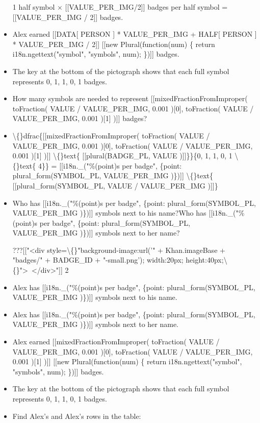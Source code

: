 \documentclass{article}
\begin{document}
\begin{itemize}
                            1 half symbol  $\times$ [[VALUE\_PER\_IMG/2]] badges per half symbol  = [[VALUE\_PER\_IMG / 2]]
                            badges.
  \item Alex earned [[DATA[ PERSON ] * VALUE\_PER\_IMG + HALF[ PERSON ] * VALUE\_PER\_IMG / 2]] [[new Plural(function(num) \{
            return i18n.ngettext("symbol", "symbols", num);
        \})]] badges.
  \item The key at the bottom of the pictograph shows that each full symbol represents 0, 1, 1, 0, 1 badges.
  \item How many symbols are needed to represent [[mixedFractionFromImproper( toFraction( VALUE / VALUE\_PER\_IMG, 0.001 )[0], toFraction( VALUE / VALUE\_PER\_IMG, 0.001 )[1] )]] badges?
  \item \textbackslash\{\}dfrac\{[[mixedFractionFromImproper( toFraction( VALUE / VALUE\_PER\_IMG, 0.001 )[0], toFraction( VALUE / VALUE\_PER\_IMG, 0.001 )[1] )]] \textbackslash\{\}text\{ [[plural(BADGE\_PL, VALUE )]]\}\}\{0, 1, 1, 0, 1 \textbackslash\{\}text\{ 4\}\} =
                        [[i18n.\_("\%(point)s per badge", \{point: plural\_form(SYMBOL\_PL, VALUE\_PER\_IMG )\})]] \textbackslash\{\}text\{ [[plural\_form(SYMBOL\_PL, VALUE / VALUE\_PER\_IMG )]]\}
  \item Who has [[i18n.\_("\%(point)s per badge", \{point: plural\_form(SYMBOL\_PL, VALUE\_PER\_IMG )\})]] symbols next to his name?Who has [[i18n.\_("\%(point)s per badge", \{point: plural\_form(SYMBOL\_PL, VALUE\_PER\_IMG )\})]] symbols next to her name?
                    
                        ???[["<div style=\textbackslash\{\}"background-image:url('" + Khan.imageBase + "badges/" + BADGE\_ID + "-small.png'); width:20px; height:40px;\textbackslash\{\}"> </div>"]]
                        2
  \item Alex has [[i18n.\_("\%(point)s per badge", \{point: plural\_form(SYMBOL\_PL, VALUE\_PER\_IMG )\})]] symbols next to his name.
  \item Alex has [[i18n.\_("\%(point)s per badge", \{point: plural\_form(SYMBOL\_PL, VALUE\_PER\_IMG )\})]] symbols next to her name.
  \item Alex earned [[mixedFractionFromImproper( toFraction( VALUE / VALUE\_PER\_IMG, 0.001 )[0], toFraction( VALUE / VALUE\_PER\_IMG, 0.001 )[1] )]] [[new Plural(function(num) \{
            return i18n.ngettext("symbol", "symbols", num);
        \})]] badges.
  \item The key at the bottom of the pictograph shows that each full symbol represents 0, 1, 1, 0, 1 badges.
  \item Find Alex's and Alex's rows in the table:
                    

\end{itemize}
\end{document}
